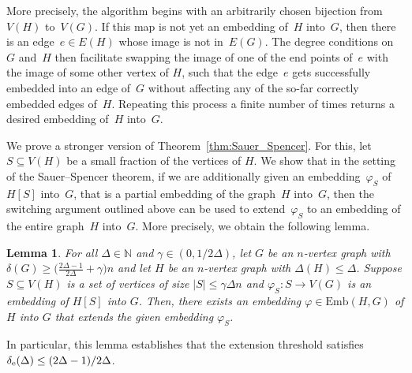 \documentclass[final]{article}
\newtheorem{lemma}[theorem]{Lemma}
\theoremstyle{definition}
\newcommand{\Emb}{\mathrm{Emb}}
\newcommand{\exth}{\delta_{\rm e}(\Delta)}
\begin{document}
More precisely, the algorithm begins with an arbitrarily chosen bijection from~$V(H)$ to~$V(G)$. If this map is not yet an embedding of~$H$ into~$G$, then there is an edge~$e \in E(H)$ whose image is not in~$E(G)$. The degree conditions on~$G$ and~$H$ then facilitate swapping the image of one of the end points of~$e$ with the image of some other vertex of $H$, such that the edge~$e$ gets successfully embedded into an edge of~$G$ without affecting any of the so-far correctly embedded edges of~$H$. Repeating this process a finite number of times returns a desired embedding of~$H$ into~$G$.

We prove a stronger version of Theorem~\ref{thm:Sauer_Spencer}. For this, let $S \subseteq V(H)$ be a small fraction of the vertices of $H$. We show that in the setting of the Sauer--Spencer theorem, if we are additionally given an embedding~$\varphi_S$ of~$H[S]$ into~$G$, that is a partial embedding of the graph~$H$ into~$G$, then the switching argument outlined above can be used to extend~$\varphi_S$ to an embedding of the entire graph~$H$ into~$G$. More precisely, we obtain the following lemma.

\begin{lemma}
    \label{lem:extender_sauer_spencer}
    For all\/ $\Delta \in \mathbb{N}$ and\/ $\gamma \in (0, 1/2\Delta)$, 
    let\/ $G$ be an $n$-vertex graph with\/ $\delta(G) \geq \bigl(\frac{2\Delta-1}{2\Delta} + \gamma \bigr)n$ and let $H$ be an $n$-vertex graph with\/ $\Delta(H) \leq \Delta$. 
    Suppose\/ $S \subseteq V(H)$ is a set of vertices of size\/ $|S| \leq \gamma \Delta n$ and\/ 
    $\varphi_S: S \to V(G)$ is an embedding of\/ $H[S]$ into\/ $G$. 
    Then, there exists an embedding\/ $\varphi \in \Emb(H,G)$ of\/ $H$ into\/ $G$ that extends the given embedding $\varphi_S$. 
\end{lemma}

In particular, this lemma establishes that the extension threshold satisfies $\exth\leq (2\Delta-1)/2\Delta$.
\end{document}
